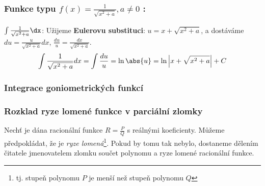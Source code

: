       \subsubsection*{Funkce typu $\boxed{f(x)=\frac{1}{\sqrt{x^2+a}}}, a\neq0$ :}
         \begin{example}\label{ma:ex_sub_metoda1}
           \(\int\frac{1}{\sqrt{x^2+a}}\dx\):\vskip0.5mm
           Užijeme \textbf{Eulerovu substituci}: \(u=x+\sqrt{x^2+a}\), a dostáváme
           \(du=\frac{u}{\sqrt{x^2+a}}dx\), \(\frac{du}{u}=\frac{dx}{\sqrt{x^2+a}}\).
           \begin{equation*}
             \int{\frac{1}{\sqrt{x^2+a}}dx}=\int{\frac{du}{u}}=\ln\abs{u}
                                           =\ln\left\lvert x+\sqrt{x^2+a}\right\rvert+C
           \end{equation*}
         \end{example}
  
    \subsubsection{Integrace goniometrických funkcí}
      
    \subsubsection{Rozklad ryze lomené funkce v parciální zlomky}
      Nechť je dána racionální funkce $R = \frac{P}{Q}$ s reálnými koeficienty. Můžeme
      předpokládat, že je \emph{ryze lomená}\footnote{tj. stupeň polynomu $P$ je menší než
      stupeň polynomu $Q$}. Pokud by tomu tak nebylo, dostaneme dělením čitatele jmenovatelem
      zlomku součet polynomu a ryze lomené racionální funkce.
      
